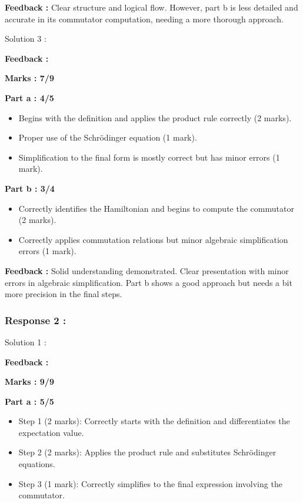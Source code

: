 \documentclass[a4paper,11pt]{article}
\begin{document}
\textbf{Feedback :}
Clear structure and logical flow. However, part b is less detailed and accurate in its commutator computation, needing a more thorough approach.



Solution 3 :

\textbf{Feedback :}

\textbf{Marks : 7/9}

\textbf{Part a : 4/5}

\begin{itemize}
    \item Begins with the definition and applies the product rule correctly (2 marks).
    \item Proper use of the Schrödinger equation (1 mark).
    \item Simplification to the final form is mostly correct but has minor errors (1 mark).
\end{itemize}


\textbf{Part b : 3/4}

\begin{itemize}
    \item Correctly identifies the Hamiltonian and begins to compute the commutator (2 marks).
    \item Correctly applies commutation relations but minor algebraic simplification errors (1 mark).
\end{itemize}

\textbf{Feedback :}
Solid understanding demonstrated. Clear presentation with minor errors in algebraic simplification. Part b shows a good approach but needs a bit more precision in the final steps.



\subsubsection*{Response 2 :}

Solution 1 :

\textbf{Feedback :}

\textbf{Marks : 9/9}

\textbf{Part a : 5/5}

\begin{itemize}
    \item Step 1 (2 marks): Correctly starts with the definition and differentiates the expectation value.
    \item Step 2 (2 marks): Applies the product rule and substitutes Schrödinger equations.
    \item Step 3 (1 mark): Correctly simplifies to the final expression involving the commutator.
\end{itemize}
\end{document}
